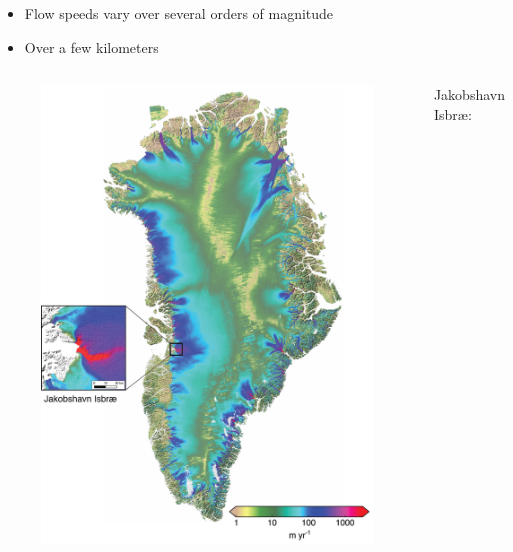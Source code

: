\documentclass[hide notes,intlimits]{beamer}
\begin{document}
\begin{frame}[plain]

\begin{itemize}
\item Flow speeds vary over several orders of magnitude
\item Over a few kilometers
\end{itemize}

\vspace{-5mm}
  \begin{columns}
    \column[c]{5.5cm}
    \begin{figure}
      \includegraphics[width=\textwidth]{greenland-obs-overview}
    \end{figure}
    \column[c]{6cm}
    Jakobshavn Isbr{\ae}:
    

\end{columns}
\end{frame}
\end{document}
